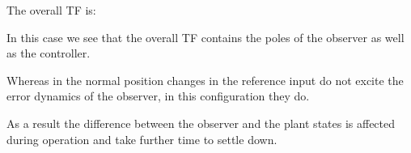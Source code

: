  

 
The overall TF is:

 

In this case we see that the overall TF contains the poles of the observer as well as the controller.

Whereas in the normal position changes in the reference input do not excite the error dynamics of the observer, in this configuration they do.

As a result the difference between the observer and the plant states is affected during operation and take further time to settle down.







\endinput

